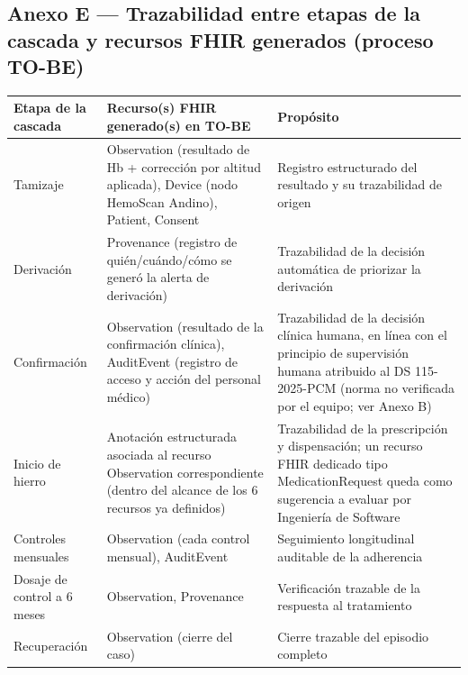 \documentclass[11pt,a4paper]{article}
\begin{document}
\subsection{Anexo E --- Trazabilidad entre etapas de la cascada y recursos FHIR generados (proceso TO-BE)}\label{anexo-e-trazabilidad-entre-etapas-de-la-cascada-y-recursos-fhir-generados-proceso-to-be}

{\small
\begin{longtable}[]{@{}
  >{\raggedright\arraybackslash}p{}
  >{\raggedright\arraybackslash}p{}
  >{\raggedright\arraybackslash}p{}@{}}
\toprule\noalign{}
\begin{minipage}[b]{\linewidth}\raggedright
Etapa de la cascada
\end{minipage} & \begin{minipage}[b]{\linewidth}\raggedright
Recurso(s) FHIR generado(s) en TO-BE
\end{minipage} & \begin{minipage}[b]{\linewidth}\raggedright
Propósito
\end{minipage} \\
\midrule\noalign{}
\endhead
\bottomrule\noalign{}
\endlastfoot
Tamizaje & Observation (resultado de Hb + corrección por altitud aplicada), Device (nodo HemoScan Andino), Patient, Consent & Registro estructurado del resultado y su trazabilidad de origen \\
Derivación & Provenance (registro de quién/cuándo/cómo se generó la alerta de derivación) & Trazabilidad de la decisión automática de priorizar la derivación \\
Confirmación & Observation (resultado de la confirmación clínica), AuditEvent (registro de acceso y acción del personal médico) & Trazabilidad de la decisión clínica humana, en línea con el principio de supervisión humana atribuido al DS 115-2025-PCM (norma no verificada por el equipo; ver Anexo B) \\
Inicio de hierro & Anotación estructurada asociada al recurso Observation correspondiente (dentro del alcance de los 6 recursos ya definidos) & Trazabilidad de la prescripción y dispensación; un recurso FHIR dedicado tipo MedicationRequest queda como sugerencia a evaluar por Ingeniería de Software \\
Controles mensuales & Observation (cada control mensual), AuditEvent & Seguimiento longitudinal auditable de la adherencia \\
Dosaje de control a 6 meses & Observation, Provenance & Verificación trazable de la respuesta al tratamiento \\
Recuperación & Observation (cierre del caso) & Cierre trazable del episodio completo \\
\end{longtable}
}
\end{document}
